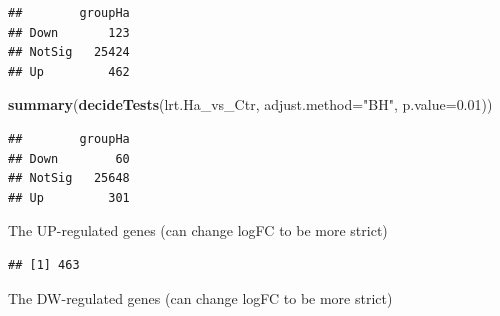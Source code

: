 \documentclass[
]{article}
\newenvironment{Shaded}{\begin{snugshade}}{\end{snugshade}}
\newcommand{\AttributeTok}[1]{\textcolor[rgb]{0.13,0.29,0.53}{#1}}
\newcommand{\DecValTok}[1]{\textcolor[rgb]{0.00,0.00,0.81}{#1}}
\newcommand{\FloatTok}[1]{\textcolor[rgb]{0.00,0.00,0.81}{#1}}
\newcommand{\FunctionTok}[1]{\textcolor[rgb]{0.13,0.29,0.53}{\textbf{#1}}}
\newcommand{\NormalTok}[1]{#1}
\newcommand{\OtherTok}[1]{\textcolor[rgb]{0.56,0.35,0.01}{#1}}
\newcommand{\SpecialCharTok}[1]{\textcolor[rgb]{0.81,0.36,0.00}{\textbf{#1}}}
\newcommand{\StringTok}[1]{\textcolor[rgb]{0.31,0.60,0.02}{#1}}
\begin{document}
\begin{verbatim}
##        groupHa
## Down       123
## NotSig   25424
## Up         462
\end{verbatim}

\begin{Shaded}
\begin{Highlighting}[]
\FunctionTok{summary}\NormalTok{(}\FunctionTok{decideTests}\NormalTok{(lrt.Ha\_vs\_Ctr, }\AttributeTok{adjust.method=}\StringTok{"BH"}\NormalTok{, }\AttributeTok{p.value=}\FloatTok{0.01}\NormalTok{))}
\end{Highlighting}
\end{Shaded}

\begin{verbatim}
##        groupHa
## Down        60
## NotSig   25648
## Up         301
\end{verbatim}

The UP-regulated genes (can change logFC to be more strict)

\begin{Shaded}
\end{Shaded}

\begin{verbatim}
## [1] 463
\end{verbatim}

\begin{Shaded}
\end{Shaded}

The DW-regulated genes (can change logFC to be more strict)

\begin{Shaded}
\end{Shaded}
\end{document}
